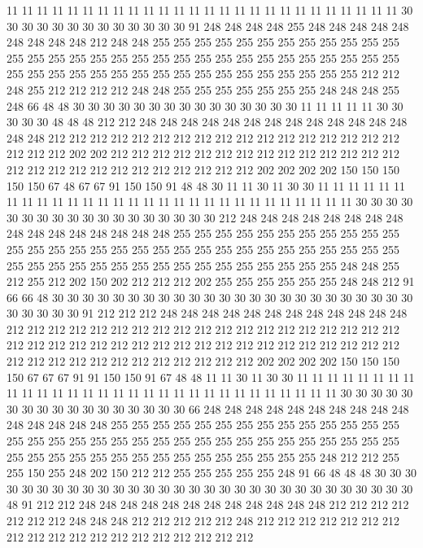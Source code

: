 11 11 11 11 11 11 11 11 11 11 11 11 11 11 11 11 11 11 11 11
11 11 11 11 11 11 30 30 30 30 30 30 30 30 30 30 30 30 30 91
248 248 248 248 255 248 248 248 248 248 248 248 248 248 212 248 248 255 255 255
255 255 255 255 255 255 255 255 255 255 255 255 255 255 255 255 255 255 255 255
255 255 255 255 255 255 255 255 255 255 255 255 255 255 255 255 255 255 255 255
255 255 255 255 255 212 212 248 255 212 212 212 212 248 248 255 255 255 255 255
255 255 248 248 248 255 248 66 48 48 30 30 30 30 30 30 30 30 30 30
30 30 30 30 30 11 11 11 11 11 30 30 30 30 30 48 48 48 212 212
248 248 248 248 248 248 248 248 248 248 248 248 248 248 248 212 212 212 212 212
212 212 212 212 212 212 212 212 212 212 212 212 212 212 212 202 202 212 212 212
212 212 212 212 212 212 212 212 212 212 212 212 212 212 212 212 212 212 212 212
212 212 212 202 202 202 202 150 150 150 150 150 67 48 67 67 91 150 150 91
48 48 30 11 11 30 11 30 30 11 11 11 11 11 11 11 11 11 11 11
11 11 11 11 11 11 11 11 11 11 11 11 11 11 11 11 11 11 30 30
30 30 30 30 30 30 30 30 30 30 30 30 30 30 30 30 212 248 248 248
248 248 248 248 248 248 248 248 248 248 248 248 248 255 255 255 255 255 255 255
255 255 255 255 255 255 255 255 255 255 255 255 255 255 255 255 255 255 255 255
255 255 255 255 255 255 255 255 255 255 255 255 255 255 255 255 255 255 255 248
248 255 212 255 212 202 150 202 212 212 212 202 255 255 255 255 255 255 248 248
212 91 66 66 48 30 30 30 30 30 30 30 30 30 30 30 30 30 30 30
30 30 30 30 30 30 30 30 30 30 30 30 30 30 91 212 212 212 248 248
248 248 248 248 248 248 248 248 248 248 212 212 212 212 212 212 212 212 212 212
212 212 212 212 212 212 212 212 212 212 212 212 212 212 212 212 212 212 212 212
212 212 212 212 212 212 212 212 212 212 212 212 212 212 212 212 212 212 212 212
202 202 202 202 150 150 150 150 67 67 67 91 91 150 150 91 67 48 48 11
11 30 11 30 30 11 11 11 11 11 11 11 11 11 11 11 11 11 11 11
11 11 11 11 11 11 11 11 11 11 11 11 11 11 11 30 30 30 30 30
30 30 30 30 30 30 30 30 30 30 30 30 66 248 248 248 248 248 248 248
248 248 248 248 248 248 248 248 255 255 255 255 255 255 255 255 255 255 255 255
255 255 255 255 255 255 255 255 255 255 255 255 255 255 255 255 255 255 255 255
255 255 255 255 255 255 255 255 255 255 255 255 255 255 255 255 248 212 212 255
255 150 255 248 202 150 212 212 255 255 255 255 255 248 91 66 48 48 48 30
30 30 30 30 30 30 30 30 30 30 30 30 30 30 30 30 30 30 30 30
30 30 30 30 30 30 30 30 30 48 91 212 212 248 248 248 248 248 248 248
248 248 248 248 248 212 212 212 212 212 212 212 248 248 248 212 212 212 212 212
248 212 212 212 212 212 212 212 212 212 212 212 212 212 212 212 212 212 212 212
